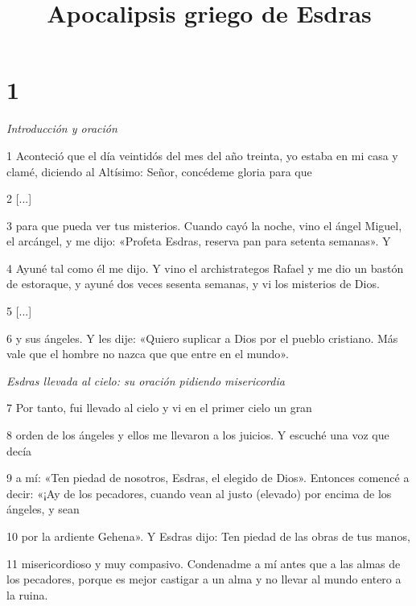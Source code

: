 

\title{Apocalipsis griego de Esdras}

\chapter{1}

\par \textit{Introducción y oración}

\par 1 Aconteció que el día veintidós del mes del año treinta, yo estaba en mi casa y clamé, diciendo al Altísimo: Señor, concédeme gloria para que

\par 2 [...]


\par 3 para que pueda ver tus misterios. Cuando cayó la noche, vino el ángel Miguel, el arcángel, y me dijo: «Profeta Esdras, reserva pan para setenta semanas». Y

\par 4 Ayuné tal como él me dijo. Y vino el archistrategos Rafael y me dio un bastón de estoraque, y ayuné dos veces sesenta semanas, y vi los misterios de Dios.

\par 5 [...]

\par 6 y sus ángeles. Y les dije: «Quiero suplicar a Dios por el pueblo cristiano. Más vale que el hombre no nazca que que entre en el mundo».

\par \textit{Esdras llevada al cielo: su oración pidiendo misericordia}

\par 7 Por tanto, fui llevado al cielo y vi en el primer cielo un gran

\par 8 orden de los ángeles y ellos me llevaron a los juicios. Y escuché una voz que decía

\par 9 a mí: «Ten piedad de nosotros, Esdras, el elegido de Dios». Entonces comencé a decir: «¡Ay de los pecadores, cuando vean al justo (elevado) por encima de los ángeles, y sean

\par 10 por la ardiente Gehena». Y Esdras dijo: Ten piedad de las obras de tus manos,

\par 11 misericordioso y muy compasivo. Condenadme a mí antes que a las almas de los pecadores, porque es mejor castigar a un alma y no llevar al mundo entero a la ruina.

